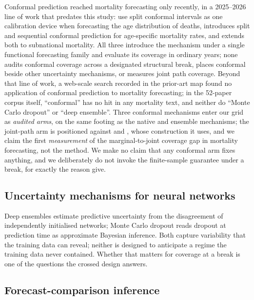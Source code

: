 Conformal prediction reached mortality forecasting only recently, in a
2025--2026 line of work that predates this study:
\citet{shang2025intervals} use split conformal intervals as one calibration
device when forecasting the age distribution of deaths,
\citet{shang2026conformal} introduces split and sequential conformal
prediction for age-specific mortality rates, and
\citet{shang2026subnational} extends both to subnational mortality. All
three introduce the mechanism under a single functional forecasting family
and evaluate its coverage in ordinary years; none audits conformal coverage
across a designated structural break, places conformal beside other
uncertainty mechanisms, or measures joint path coverage. Beyond that line
of work, a web-scale search recorded in the prior-art map found no
application of conformal prediction to mortality forecasting; in the
52-paper corpus itself, ``conformal'' has no hit in any mortality text, and
neither do ``Monte Carlo dropout'' or ``deep
ensemble''. Three conformal mechanisms enter our grid as \emph{audited
arms}, on the same footing as the native and ensemble mechanisms; the
joint-path arm is positioned against \citet{stankeviciute2021conformal}
and \citet{diquigiovanni2022conformal}, whose construction it uses, and we
claim the first \emph{measurement} of the marginal-to-joint coverage gap in
mortality forecasting, not the method. We make no claim that any conformal
arm fixes anything, and we deliberately do not invoke the finite-sample
guarantee under a break, for exactly the reason \citet{barber2023conformal}
give.

\subsection{Uncertainty mechanisms for neural networks}

Deep ensembles \citep{lakshminarayanan2017simple} estimate predictive
uncertainty from the disagreement of independently initialised networks;
Monte Carlo dropout \citep{gal2016dropout} reads dropout at prediction time
as approximate Bayesian inference. Both capture variability that the
training data can reveal; neither is designed to anticipate a regime the
training data never contained. Whether that matters for coverage at a break
is one of the questions the crossed design answers.

\subsection{Forecast-comparison inference}

